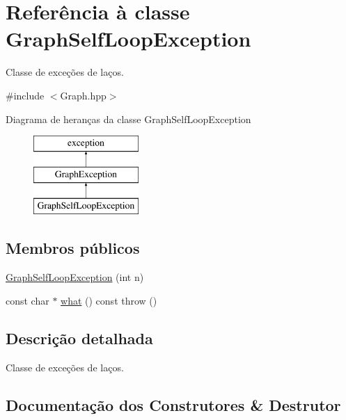 \hypertarget{classGraphSelfLoopException}{}\section{Referência à classe Graph\+Self\+Loop\+Exception}
\label{classGraphSelfLoopException}


Classe de exceções de laços.  




{\ttfamily \#include $<$Graph.\+hpp$>$}

Diagrama de heranças da classe Graph\+Self\+Loop\+Exception\begin{figure}[H]
\begin{center}
\leavevmode
\includegraphics[height=3.000000cm]{classGraphSelfLoopException}
\end{center}
\end{figure}
\subsection*{Membros públicos}
\begin{DoxyCompactItemize}
\item 
\hyperlink{classGraphSelfLoopException_ad9e05922cf212c3fcd30426bf30f982e}{Graph\+Self\+Loop\+Exception} (int n)
\item 
const char $\ast$ \hyperlink{classGraphSelfLoopException_ae608d642082d2183111b8a43a1bfa64f}{what} () const  throw ()
\end{DoxyCompactItemize}


\subsection{Descrição detalhada}
Classe de exceções de laços. 

\subsection{Documentação dos Construtores \& Destrutor}
\mbox{\label{classGraphSelfLoopException_ad9e05922cf212c3fcd30426bf30f982e}} 
